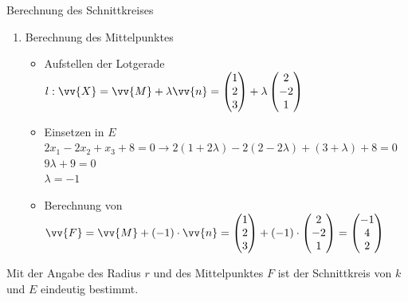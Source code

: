 \begin{rechnung}{Berechnung des Schnittkreises}{}
\begin{enumerate}
        \item Berechnung des Mittelpunktes
        \begin{itemize}
            \item Aufstellen der Lotgerade \(l:\vv{X} = \vv{M} + \lambda\vv{n} = \begin{pmatrix}
                1\\2\\3
            \end{pmatrix} + \lambda \begin{pmatrix}
                2\\-2\\1
            \end{pmatrix}\)
            \item  Einsetzen in \(E\)\\ \(2x_1-2x_2+x_3+8 =0 \longrightarrow 2(1+2\lambda)-2(2-2\lambda)+(3+\lambda) +8 =0\)\\ \(9\lambda +9 =0\)\\ \( \lambda =-1\)
            \item Berechnung von \(\vv{F} = \vv{M}+ \left(-1\right)\cdot \vv{n} = \begin{pmatrix}
                1\\2\\3
            \end{pmatrix} + \left(-1\right)\cdot\begin{pmatrix}
                2\\-2\\1
            \end{pmatrix} = \begin{pmatrix}
                -1\\4\\2
            \end{pmatrix}\)
        \end{itemize}
    \end{enumerate}
    Mit der Angabe des Radius \(r\) und des Mittelpunktes \(F\) ist der Schnittkreis von \(k\) und \(E\) eindeutig bestimmt. \end{rechnung}
